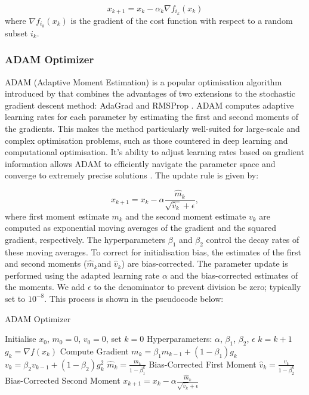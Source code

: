 \documentclass[a4paper]{report}
\begin{document}
\begin{equation}\label{SGD}
x_{k+1} = x_k - \alpha_k \nabla f_{i_k}(x_k)	
\end{equation}
where $\nabla f_{i_k}(x_k)$ is the gradient of the cost function with respect to a random subset $i_k$.

\subsubsection{ADAM Optimizer}\label{section:ADAM}
ADAM (Adaptive Moment Estimation) is a popular optimisation algorithm introduced by \citet{kingma2014adam} that combines the advantages of two extensions to the stochastic gradient descent method: AdaGrad \citep{duchi2011adaptive} and RMSProp \citep{tieleman2012rmsprop}. ADAM computes adaptive learning rates for each parameter by estimating the first and second moments of the gradients. This makes the method particularly well-suited for large-scale and complex optimisation problems, such as those countered in deep learning and computational optimisation. It's ability to adjust learning rates based on gradient information allows ADAM to efficiently navigate the parameter space and converge to extremely precise solutions \citep{reddi2019convergence}. The update rule is given by:

\begin{equation}
x_{k+1} = x_{k} - \alpha \frac{\hat{m}_{k}}{\sqrt{\hat{v}_{k}} + \epsilon},
\end{equation}
where first moment estimate $m_k$ and the second moment estimate $v_k$ are computed as exponential moving averages of the gradient and the squared gradient, respectively. The hyperparameters $\beta_1$ and $\beta_2$ control the decay rates of these moving averages. To correct for initialisation bias, the estimates of the first and second moments ($\hat{m}_k$and $\hat{v}_k$) are bias-corrected. The parameter update is performed using the adapted learning rate $\alpha$ and the bias-corrected estimates of the moments. We add $\epsilon$ to the denominator to prevent division be zero; typically set to $10^{-8}$. This process is shown in the pseudocode below:

\begin{algorithm}[H]
\caption{ADAM Optimizer}
\label{algo:ADAM}
\begin{algorithmic}[1]
\State Initialise \( x_0 \), \( m_0 = 0 \), \( v_0 = 0 \), set \( k = 0 \)
\State Hyperparameters: \( \alpha \), \( \beta_1 \), \( \beta_2 \), \( \epsilon \)
    \State \( k = k + 1 \)
    \State \( g_k = \nabla f(x_k) \) \Comment Compute Gradient
    \State \( m_k = \beta_1 m_{k-1} + (1 - \beta_1) g_k \)
    \State \( v_k = \beta_2 v_{k-1} + (1 - \beta_2) g_k^2 \)
    \State \( \hat{m}_k = \frac{m_k}{1 - \beta_1^k} \) \Comment Bias-Corrected First Moment
    \State  \( \hat{v}_k = \frac{v_k}{1 - \beta_2^k} \) \Comment Bias-Corrected Second Moment
    \State \( x_{k+1} = x_k - \alpha \frac{\hat{m}_k}{\sqrt{\hat{v}_k} + \epsilon} \)
\EndWhile
\end{algorithmic}
\end{algorithm}
\end{document}
